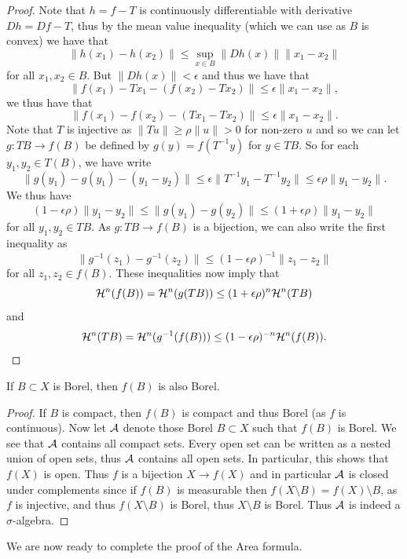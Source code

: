 \documentclass[twoside, a4paper, 10pt]{amsart}
\begin{document}
\begin{proof} Note that $h = f-T$ is continuously differentiable with derivative $Dh = Df-T$, thus by the mean value inequality (which we can use as $B$ is convex) we have that $$\|h(x_1) - h(x_2)\| \leq \sup_{x \in B}\|Dh(x)\| \|x_1 -x_2\|$$ for all $x_1,x_2 \in B$. But $\|Dh(x)\| < \epsilon$ and thus we have that $$\|f(x_1) - Tx_1 - (f(x_2) - Tx_2)\| \leq \epsilon \|x_1 - x_2 \|,$$ we thus have that $$\|f(x_1) - f(x_2) - (Tx_1 - Tx_2)\| \leq \epsilon \|x_1 - x_2\|.$$ Note that $T$ is injective as $\|Tu\| \geq \rho \|u\| >0$ for non-zero $u$ and so we can let $g:TB \to f(B)$ be defined by $g(y) = f(T^{-1}y)$ for $y \in TB$. So for each $y_1, y_2 \in T(B)$, we have write $$\|g(y_1) - g(y_1) - (y_1 - y_2)\| \leq  \epsilon \|T^{-1}y_1 - T^{-1}y_2\| \leq \epsilon \rho \|y_1 - y_2\|.$$ We thus have 
$$(1 - \epsilon\rho)\|y_1  - y_2\| \leq \|g(y_1) - g(y_2)\| \leq (1 + \epsilon\rho)\|y_1  - y_2\|$$
for all $y_1,y_2 \in TB.$ As $g:TB \to f(B)$ is a bijection, we can also write the first inequality as 
$$\| g^{-1}(z_1) - g^{-1}(z_2)\| \leq (1 - \epsilon\rho)^{-1} \|z_1 - z_2\|$$ for all $z_1,z_2 \in f(B)$. These inequalities now imply that 
$$\mathcal{H}^n(f(B)) = \mathcal{H}^n(g(TB)) \leq (1+\epsilon \rho)^n \mathcal{H}^n(TB) $$ and $$\mathcal{H}^n(TB) =  \mathcal{H}^n(g^{-1}(f(B))) \leq (1- \epsilon \rho)^{-n} \mathcal{H}^n(f(B)).$$

\end{proof}

\begin{lemma} If $B \subset X$ is Borel, then $f(B)$ is also Borel.

\end{lemma}

\begin{proof} If $B$ is compact, then $f(B)$ is compact and thus Borel (as $f$ is continuous). Now let $\mathcal{A}$ denote those Borel $B \subset X$ such that $f(B)$ is Borel. We see that $\mathcal{A}$ contains all compact sets. Every open set can be written as a nested union of open sets, thus $\mathcal{A}$ contains all open sets. In particular, this shows that $f(X)$ is open. Thus $f$ is a bijection $X \to f(X)$ and in particular $\mathcal{A}$ is closed under complements since if $f(B)$ is measurable then $f(X \setminus B) = f(X) \setminus B$, as $f$ is injective, and thus $f(X \setminus B)$ is Borel, thus $X \setminus B$ is Borel. Thus $\mathcal{A}$ is indeed a $\sigma$-algebra. \end{proof}

We are now ready to complete the proof of the Area formula.
\end{document}
